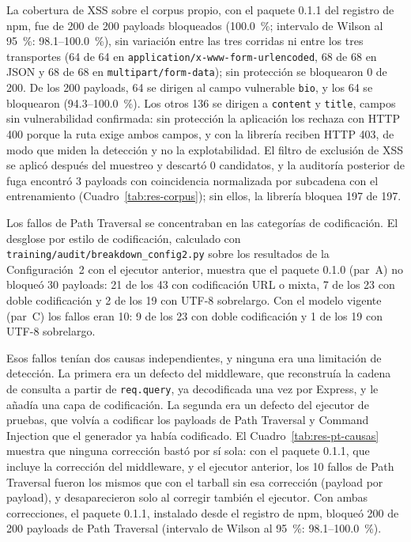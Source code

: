 La cobertura de XSS sobre el corpus propio, con el paquete 0.1.1 del registro de npm, fue de 200
de 200 payloads bloqueados (100.0~\%; intervalo de Wilson al 95~\%: 98.1--100.0~\%), sin variación
entre las tres corridas ni entre los tres transportes (64 de 64 en
\texttt{application/x-www-form-urlencoded}, 68 de 68 en JSON y 68 de 68 en
\texttt{multipart/form-data}); sin protección se bloquearon 0 de 200. De los 200 payloads, 64 se
dirigen al campo vulnerable \texttt{bio}, y los 64 se bloquearon (94.3--100.0~\%). Los otros 136 se
dirigen a \texttt{content} y \texttt{title}, campos sin vulnerabilidad confirmada: sin protección la
aplicación los rechaza con HTTP 400 porque la ruta exige ambos campos, y con la librería reciben
HTTP 403, de modo que miden la detección y no la explotabilidad. El filtro de exclusión de XSS se
aplicó después del muestreo y descartó 0 candidatos, y la auditoría posterior de fuga encontró 3
payloads con coincidencia normalizada por subcadena con el entrenamiento (Cuadro~\ref{tab:res-corpus});
sin ellos, la librería bloquea 197 de 197.

Los fallos de Path Traversal se concentraban en las categorías de codificación. El desglose por
estilo de codificación, calculado con \texttt{training/audit/breakdown\_config2.py} sobre los
resultados de la Configuración~2 con el ejecutor anterior, muestra que el paquete 0.1.0 (par~A) no
bloqueó 30 payloads: 21 de los 43 con codificación URL o mixta, 7 de los 23 con doble codificación
y 2 de los 19 con UTF-8 sobrelargo. Con el modelo vigente (par~C) los fallos eran 10: 9 de los 23
con doble codificación y 1 de los 19 con UTF-8 sobrelargo.

Esos fallos tenían dos causas independientes, y ninguna era una limitación de detección. La primera
era un defecto del middleware, que reconstruía la cadena de consulta a partir de \texttt{req.query},
ya decodificada una vez por Express, y le añadía una capa de codificación. La segunda era un defecto
del ejecutor de pruebas, que volvía a codificar los payloads de Path Traversal y Command Injection
que el generador ya había codificado. El Cuadro~\ref{tab:res-pt-causas} muestra que ninguna
corrección bastó por sí sola: con el paquete 0.1.1, que incluye la corrección del middleware, y el
ejecutor anterior, los 10 fallos de Path Traversal fueron los mismos que con el tarball sin esa
corrección (payload por payload), y desaparecieron solo al corregir también el ejecutor. Con ambas
correcciones, el paquete 0.1.1, instalado desde el registro de npm, bloqueó 200 de 200 payloads de
Path Traversal (intervalo de Wilson al 95~\%: 98.1--100.0~\%).

